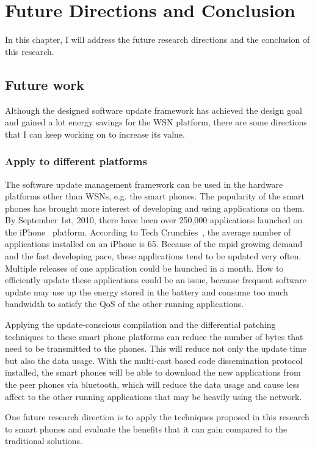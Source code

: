 \chapter{Future Directions and Conclusion }

In this chapter, I will address the future research directions and the conclusion of this research.

\section{Future work}
Although the designed software update framework has achieved the design goal and gained a lot energy savings for the 
WSN platform, there are some directions that I can keep working on to increase its value.

\subsection{Apply to different platforms}
The software update management framework can be used in the hardware platforms other than WSNs, e.g. the smart phones. 
The popularity of the smart phones has brought more interest of developing and using applications on them.
By September 1st, 2010, there have been over 250,000 applications launched on the iPhone~\cite{iphone} platform. 
According to Tech Crunchies~\cite{tech}, the average number of applications installed on an iPhone is 65. 
Because of the rapid growing demand and the fast developing pace, these applications tend to be updated very often. 
Multiple releases of one application could be launched in a month.
How to efficiently update these applications could be an issue, because frequent software update may use up the energy 
stored in the battery and consume too much bandwidth to satisfy the QoS of the other running applications. 

Applying the update-conscious compilation and the differential patching techniques to these smart phone platforms can 
reduce the number of bytes that need to be transmitted to the phones. This will reduce not only the update time but 
also the data usage. With the multi-cast based code dissemination protocol installed, the smart phones will be able to 
download the new applications from the peer phones via bluetooth, which will reduce the data usage and cause less 
affect to the other running applications that may be heavily using the network.

One future research direction is to apply the techniques proposed in this research to smart phones and evaluate the 
benefits that it can gain compared to the traditional solutions.

